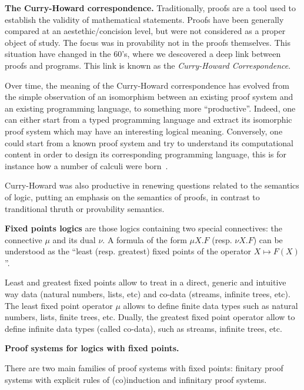 \textbf{The Curry-Howard correspondence.}
Traditionally, proofs are a tool used to establish the validity
of mathematical statements.
%
Proofs  have been generally  compared at an aestethic/concision level, but
were not considered as a proper object of study. The focus was in provability
 not in the proofs themselves.
%
This situation have changed in the 60's, where we descovered a deep link between proofs and programs. This link is known as the \textit{Curry-Howard Correspondence}.
%


  Over time, the meaning of the Curry-Howard correspondence has evolved from
  the simple observation of an isomorphism between an existing
  proof system and an existing programming language, to something more “productive”.
Indeed, one can either start from a typed programming language and extract its isomorphic proof system which may have an interesting logical meaning.
Conversely, one could start from a known proof system and try to understand its computational content
in order to design its
  corresponding programming language,
  this is for instance how a number of calculi were  born~.

  Curry-Howard was also productive in renewing questions related to the
  semantics of logic, putting an emphasis on the semantics of proofs, in contrast to tranditional thruth or provability semantics.

\bigskip
  \textbf{Fixed points logics} are those logics containing two special connectives: the connective $\mu$ and its dual $\nu$. A formula of the form $\mu X. F$ (resp. $\nu X. F$) can be understood as the “least (resp. greatest) fixed points of the operator  $X\mapsto F(X)$”.

Least and greatest fixed points allow to treat in a direct, generic and intuitive way data (natural numbers, lists, etc) and co-data (streams, infinite trees, etc). The least fixed point operator $\mu$ allows to define
finite data types such as natural numbers,  lists, finite trees, etc.
Dually, the greatest fixed point operator allow to
define infinite data types (called co-data), such as streams, infinite trees, etc.


\bigskip
\textbf{Proof systems for logics with fixed points.}

There are two main families of proof systems with fixed points: finitary proof
systems with explicit rules of (co)induction and infinitary proof systems.

